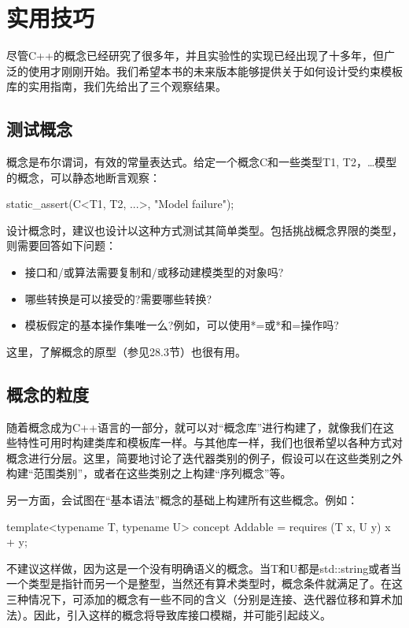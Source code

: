 \section{实用技巧}

尽管C++的概念已经研究了很多年，并且实验性的实现已经出现了十多年，但广泛的使用才刚刚开始。我们希望本书的未来版本能够提供关于如何设计受约束模板库的实用指南，我们先给出了三个观察结果。

\subsection{测试概念}

概念是布尔谓词，有效的常量表达式。给定一个概念C和一些类型T1, T2，…模型的概念，可以静态地断言观察：

\begin{cpp}
static_assert(C<T1, T2, ...>, "Model failure");
\end{cpp}

设计概念时，建议也设计以这种方式测试其简单类型。包括挑战概念界限的类型，则需要回答如下问题：

\begin{itemize}
\item 
接口和/或算法需要复制和/或移动建模类型的对象吗?

\item 
哪些转换是可以接受的?需要哪些转换?

\item 
模板假定的基本操作集唯一么?例如，可以使用*=或*和=操作吗?
\end{itemize}

这里，了解概念的原型（参见28.3节）也很有用。

\subsection{概念的粒度}

随着概念成为C++语言的一部分，就可以对“概念库”进行构建了，就像我们在这些特性可用时构建类库和模板库一样。与其他库一样，我们也很希望以各种方式对概念进行分层。这里，简要地讨论了迭代器类别的例子，假设可以在这些类别之外构建“范围类别”，或者在这些类别之上构建“序列概念”等。

另一方面，会试图在“基本语法”概念的基础上构建所有这些概念。例如：

\begin{cpp}
template<typename T, typename U>
concept Addable =
requires (T x, U y) {
	x + y;
}
\end{cpp}

不建议这样做，因为这是一个没有明确语义的概念。当T和U都是std::string或者当一个类型是指针而另一个是整型，当然还有算术类型时，概念条件就满足了。在这三种情况下，可添加的概念有一些不同的含义（分别是连接、迭代器位移和算术加法）。因此，引入这样的概念将导致库接口模糊，并可能引起歧义。


